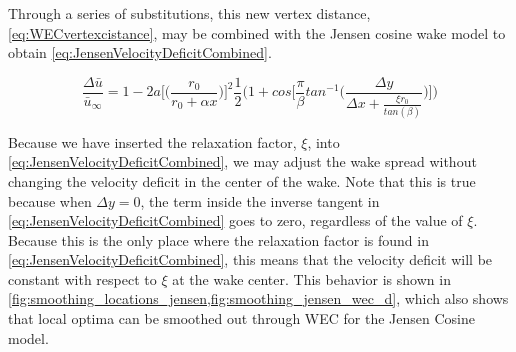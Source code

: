 \documentclass[a4paper]{jpconf}
\begin{document}
Through a series of substitutions, this new vertex distance, \cref{eq:WECvertexcistance}, may be combined with the Jensen cosine wake model to obtain \cref{eq:JensenVelocityDeficitCombined}.

\begin{equation}
\frac{\Delta \bar{u}}{\bar{u}_\infty} = 1 - 2a \Bigg[  \bigg(\frac{r_0}{r_0 + \alpha x} \bigg) \Bigg]^2 \frac{1}{2} \Bigg(1 + cos\Bigg[\frac{\pi}{\beta} tan^{-1}\Bigg(\frac{\Delta y}{\Delta x + \frac{\xi r_0}{tan(\beta)}} \Bigg) \Bigg] \Bigg)
\label{eq:JensenVelocityDeficitCombined}
\end{equation}

Because we have inserted the relaxation factor, $\xi$, into \cref{eq:JensenVelocityDeficitCombined}, we may adjust the wake spread without changing the velocity deficit in the center of the wake. Note that this is true because when $\Delta y = 0$, the term inside the inverse tangent in \cref{eq:JensenVelocityDeficitCombined} goes to zero, regardless of the value of $\xi$. Because this is the only place where the relaxation factor is found in \cref{eq:JensenVelocityDeficitCombined}, this means that the velocity deficit will be constant with respect to $\xi$ at the wake center. This behavior is shown in \cref{fig:smoothing_locations_jensen,fig:smoothing_jensen_wec_d}, which also shows that local optima can be smoothed out through WEC for the Jensen Cosine model.
\end{document}
